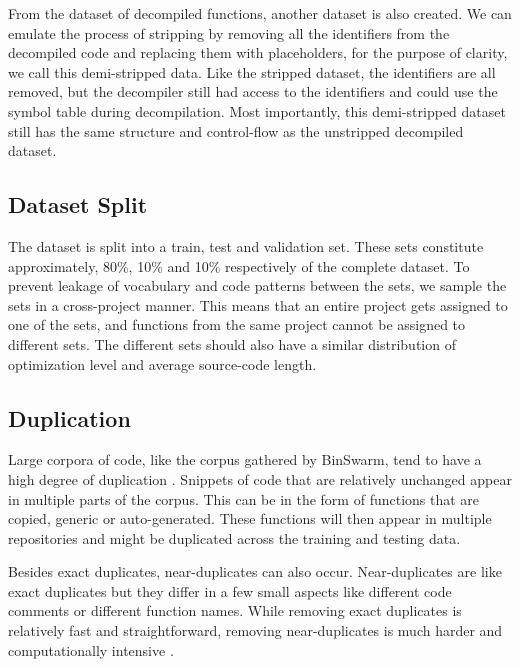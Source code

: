 From the dataset of decompiled functions, another dataset is also created. We can emulate the process of stripping by removing all the identifiers from the decompiled code and replacing them with placeholders, for the purpose of clarity, we call this demi-stripped data. Like the stripped dataset, the identifiers are all removed, but the decompiler still had access to the identifiers and could use the symbol table during decompilation. Most importantly, this demi-stripped dataset still has the same structure and control-flow as the unstripped decompiled dataset.

\subsection{Dataset Split}
The dataset is split into a train, test and validation set. These sets constitute approximately, 80\%, 10\% and 10\% respectively\cite{recommend_summarization} of the complete dataset. To prevent leakage of vocabulary and code patterns between the sets, we sample the sets in a cross-project manner. This means that an entire project gets assigned to one of the sets, and functions from the same project cannot be assigned to different sets. The different sets should also have a similar distribution of optimization level and average source-code length.

\subsection{Duplication}
Large corpora of code, like the corpus gathered by BinSwarm, tend to have a high degree of duplication \cite{leclair_recommendations}. Snippets of code that are relatively unchanged appear in multiple parts of the corpus. This can be in the form of functions that are copied, generic or auto-generated. These functions will then appear in multiple repositories and might be duplicated across the training and testing data.

Besides exact duplicates, near-duplicates can also occur. Near-duplicates are like exact duplicates but they differ in a few small aspects like different code comments or different function names. While removing exact duplicates is relatively fast and straightforward, removing near-duplicates is much harder and computationally intensive \cite{allamanis_adverse}. 

